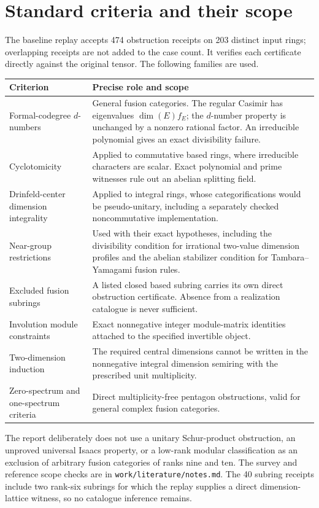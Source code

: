 \documentclass[11pt]{article}
\begin{document}
\section{Standard criteria and their scope}
The baseline replay accepts 474 obstruction receipts on 203 distinct input
rings; overlapping receipts are not added to the case count. It verifies each
certificate directly against the original tensor. The following families
are used.
{\small
\begin{longtable}{p{}p{}}
\toprule Criterion & Precise role and scope \\\midrule\endhead
Formal-codegree $d$-numbers & General fusion categories. The regular Casimir
has eigenvalues $\dim(E)f_E$; the $d$-number property is unchanged by a nonzero
rational factor. An irreducible polynomial gives an exact divisibility
failure. \\
Cyclotomicity & Applied to commutative based rings, where irreducible
characters are scalar. Exact polynomial and prime witnesses rule out an
abelian splitting field. \\
Drinfeld-center dimension integrality & Applied to integral rings, whose
categorifications would be pseudo-unitary, including a separately checked
noncommutative implementation. \\
Near-group restrictions & Used with their exact
hypotheses, including the divisibility condition for irrational two-value
dimension profiles and the abelian stabilizer condition for
Tambara--Yamagami fusion rules. \\
Excluded fusion subrings & A listed closed based subring carries its own
direct obstruction certificate. Absence from a realization catalogue is
never sufficient. \\
Involution module constraints & Exact nonnegative integer module-matrix
identities attached to the specified invertible object. \\
Two-dimension induction & The required central dimensions cannot be written
in the nonnegative integral dimension semiring with the prescribed unit
multiplicity. \\
Zero-spectrum and one-spectrum criteria & Direct multiplicity-free
pentagon obstructions, valid for general complex fusion categories. \\
\bottomrule
\end{longtable}
}
The report deliberately does not use a unitary Schur-product obstruction,
an unproved universal Isaacs property, or a low-rank modular classification
as an exclusion of arbitrary fusion categories of ranks nine and ten.
The survey and reference scope checks are in \nolinkurl{work/literature/notes.md}.
The 40 subring receipts include two rank-six subrings for which the replay
supplies a direct dimension-lattice witness, so no catalogue inference remains.
\end{document}

